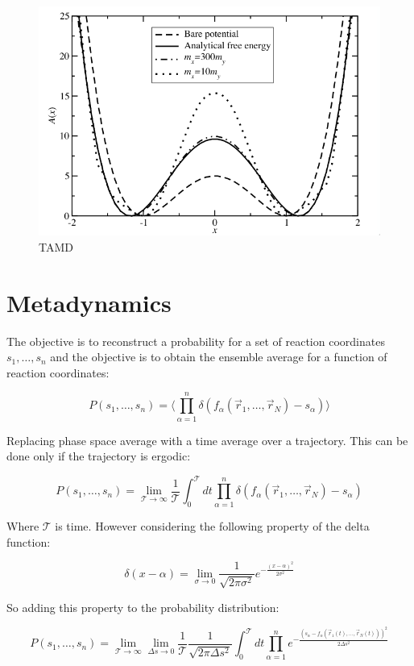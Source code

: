 	\begin{figure}[H]
		\includegraphics[width=\textwidth]{tamd}
		\caption{TAMD}
		\label{fig:tamd}
	\end{figure}

\section{Metadynamics}
The objective is to reconstruct a probability for a set of reaction coordinates $s_1, \dots, s_n$ and the objective is to obtain the ensemble average for a function of reaction coordinates:

$$P(s_1, \dots, s_n) = \biggl\langle\prod\limits_{\alpha=1}^n\delta(f_\alpha(\vec{r}_1, \dots, \vec{r}_N)-s_\alpha)\biggr\rangle$$

Replacing phase space average with a time average over a trajectory.
This can be done only if the trajectory is ergodic:

$$P(s_1, \dots, s_n) = \lim\limits_{\mathcal{T}\rightarrow\infty}\frac{1}{\mathcal{T}}\int_0^{\mathcal{T}} dt\prod\limits_{\alpha=1}^n\delta(f_\alpha(\vec{r}_1, \dots, \vec{r}_N)-s_\alpha)$$

Where $\mathcal{T}$ is time.
However considering the following property of the delta function:

$$\delta(x-\alpha) = \lim\limits_{\sigma\rightarrow 0}\frac{1}{\sqrt{2\pi\sigma^2}}e^{-\frac{(x-\alpha)^2}{2\sigma^2}}$$

So adding this property to the probability distribution:

$$P(s_1, \dots, s_n) = \lim\limits_{\mathcal{T}\rightarrow\infty}\lim\limits_{\Delta s\rightarrow 0}\frac{1}{\mathcal{T}}\frac{1}{\sqrt{2\pi\Delta s^2}}\int_0^{\mathcal{T}}dt\prod\limits_{\alpha=1}^ne^{-\frac{(s_\alpha-f_\alpha(\vec{r}_1(t), \dots, \vec{r}_N(t)))^2}{2\Delta s^2}}$$

